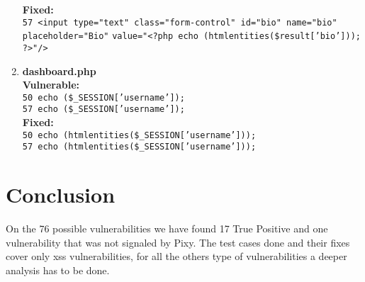 \documentclass[11pt]{article}
\begin{document}
\begin{enumerate}
	\textbf{Fixed:} \\
		\texttt{57 <input type="text" class="form-control" id="bio" name="bio" placeholder="Bio"} 
		\texttt{value="<?php echo (htmlentities(\$result['bio'])); ?>"/>} \\
		
	\item \textbf{dashboard.php} \\
	\textbf{Vulnerable:} \\ 
		\texttt{50 echo (\$\_SESSION['username']);} \\
		\texttt{57 echo (\$\_SESSION['username']);} \\
	\textbf{Fixed:} \\
	 	\texttt{50 echo (htmlentities(\$\_SESSION['username']));} \\
	 	\texttt{57 echo (htmlentities(\$\_SESSION['username']));} \\

\end{enumerate}

\section{Conclusion}

On the 76 possible vulnerabilities we have found 17 True Positive and one vulnerability that was not signaled by Pixy. The test cases done and their fixes cover only xss vulnerabilities, for all the others type of vulnerabilities a deeper analysis has to be done.
\end{document}
